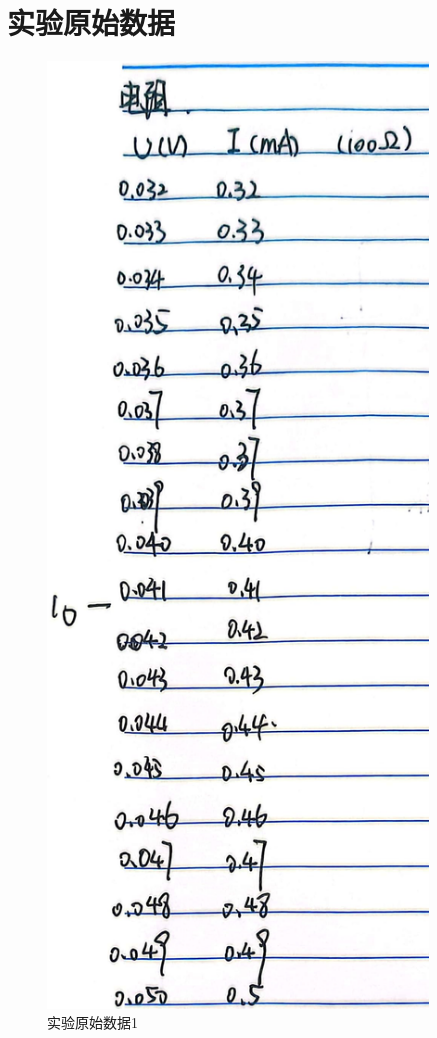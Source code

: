 \documentclass{ctexart}
\begin{document}
\section{实验原始数据}
\begin{figure}[H]
  \centering
  \includegraphics[width=0.9\textwidth,height=0.8\textheight]{dianzu.jpg}
  \caption{实验原始数据1}\label{dianzu}
\end{figure}
\newpage
\end{document}
